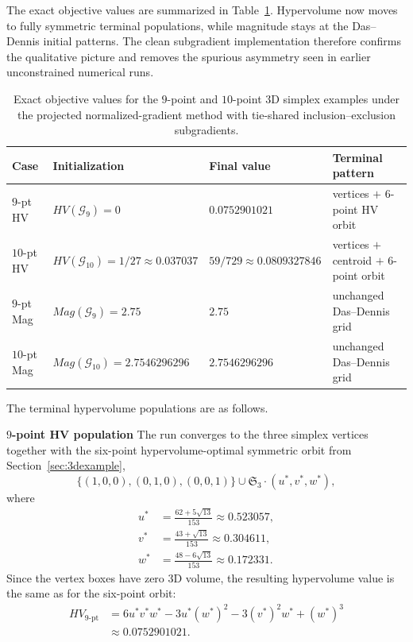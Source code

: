 \documentclass{article}
\def\HV{HV}%
\def\Mag{Mag}%
\theoremstyle{definition}
\newcommand{\Mag}{\operatorname{Mag}}
\newcommand{\HV}{\operatorname{HV}}
\newcommand{\1}{\mathbf{1}}
\newcommand{\myparagraph}[1]{\medskip\noindent\textbf{#1}}
\begin{document}
The exact objective values are summarized in Table~\ref{tab:exact3d910}. Hypervolume now moves to fully symmetric terminal populations, while magnitude stays at the Das--Dennis initial patterns. The clean subgradient implementation therefore confirms the qualitative picture and removes the spurious asymmetry seen in earlier unconstrained numerical runs.

\begin{table}[h]
\centering
\caption{Exact objective values for the $9$-point and $10$-point 3D simplex examples under the projected normalized-gradient method with tie-shared inclusion--exclusion subgradients.}
\label{tab:exact3d910}
\small
\renewcommand{\arraystretch}{1.18}
\begin{tabular}{p{1.7cm}p{3.6cm}p{3.2cm}p{4.2cm}}
\hline
Case & Initialization & Final value & Terminal pattern \\
\hline
$9$-pt HV & $\HV(\mathcal G_9)=0$ & $0.0752901021$ & vertices $+$ 6-point HV orbit \\
$10$-pt HV & $\HV(\mathcal G_{10})=1/27\approx 0.037037$ & $59/729\approx 0.0809327846$ & vertices $+$ centroid $+$ 6-point orbit \\
$9$-pt Mag & $\Mag(\mathcal G_9)=2.75$ & $2.75$ & unchanged Das--Dennis grid \\
$10$-pt Mag & $\Mag(\mathcal G_{10})=2.7546296296$ & $2.7546296296$ & unchanged Das--Dennis grid \\
\hline
\end{tabular}
\normalsize
\end{table}

The terminal hypervolume populations are as follows.

\myparagraph{$9$-point HV population}
The run converges to the three simplex vertices together with the six-point hypervolume-optimal symmetric orbit from Section~\ref{sec:3dexample},
\[
\{(1,0,0),(0,1,0),(0,0,1)\}\cup \mathfrak S_3\cdot(u^*,v^*,w^*),
\]
where
\begin{align*}
u^*&=\frac{62+5\sqrt{13}}{153}\approx 0.523057,\\
v^*&=\frac{43+\sqrt{13}}{153}\approx 0.304611,\\
w^*&=\frac{48-6\sqrt{13}}{153}\approx 0.172331.
\end{align*}
Since the vertex boxes have zero $3$D volume, the resulting hypervolume value is the same as for the six-point orbit:
\begin{align*}
\HV_{9\text{-pt}}&=6u^*v^*w^*-3u^*(w^*)^2-3(v^*)^2w^*+(w^*)^3\\
&\approx 0.0752901021.
\end{align*}
\end{document}
